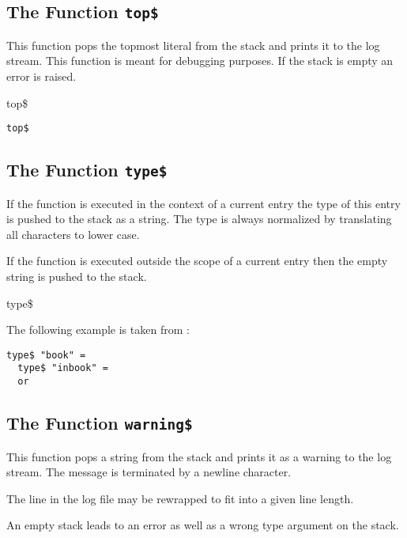\subsection{The Function \texttt{top\$}}%

This function pops the topmost literal from the stack and prints it
to the log stream. This function is meant for debugging purposes.
If the stack is empty an error is raised.

\begin{BstFunction}{top\$}
\end{BstFunction}

\begin{lstlisting}[language=bst]
  top$
\end{lstlisting}


\subsection{The Function \texttt{type\$}}%

If the function is executed in the context of a current entry the type
of this entry is pushed to the stack as a string. The type is always
normalized by translating all characters to lower case.

If the function is executed outside the scope of a current entry then
the empty string is pushed to the stack.

\begin{BstFunction}{type\$}
\end{BstFunction}

The following example is taken from :

\begin{lstlisting}[language=bst]
  type$ "book" =
  type$ "inbook" =
  or
\end{lstlisting}\fctIndex{=}


\subsection{The Function \texttt{warning\$}}%

This function pops a string from the stack and prints it as a
warning to the log stream. The message is terminated by a newline character.

The line in the log file may be rewrapped to fit into a given line
length.

An empty stack leads to an error as well as a wrong type argument on
the stack.

